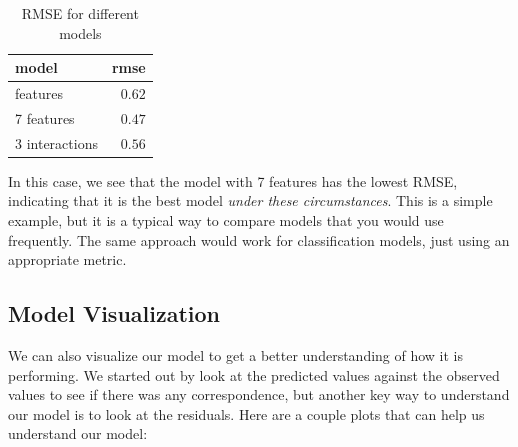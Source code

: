 \documentclass[
  letterpaper,
]{krantz}
\begin{document}
\begin{longtable}{lr}

\caption{\label{tbl-regression-compare}RMSE for different models}

\tabularnewline

\toprule
model & rmse \\ 
\midrule\addlinespace[2.5pt]
3 features & \textcolor[HTML]{404040}{$0.62$} \\ 
7 features & \textcolor[HTML]{404040}{$0.47$} \\ 
3 interactions & \textcolor[HTML]{404040}{$0.56$} \\ 
\bottomrule

\end{longtable}

In this case, we see that the model with 7 features has the lowest RMSE,
indicating that it is the best model \emph{under these circumstances}.
This is a simple example, but it is a typical way to compare models that
you would use frequently. The same approach would work for
classification models, just using an appropriate metric.

\subsection{Model Visualization}\label{model-visualization}

We can also visualize our model to get a better understanding of how it
is performing. We started out by look at the predicted values against
the observed values to see if there was any correspondence, but another
key way to understand our model is to look at the residuals. Here are a
couple plots that can help us understand our model:
\end{document}
